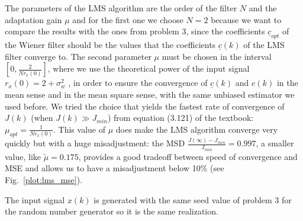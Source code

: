 \documentclass{article}
\renewcommand{\vec}[1]{\underline{#1}}
\newcommand{\E}[1]{\operatorname{E}\left[#1\right]}
\newcommand{\norm}[1]{\left\lVert#1\right\rVert}
\newcommand{\abs}[1]{\left|#1\right|}
\begin{document}
The parameters of the LMS algorithm are the order of the filter $N$
and the adaptation gain $\mu$ and for the first one we choose $N = 2$
because we want to compare the results with the ones from problem 3,
since the coefficients $\vec{c}_{opt}$ of the Wiener filter should be
the values that the coefficients $\vec{c}(k)$ of the LMS filter
converge to.  The second parameter $\mu$ must be chosen in the
interval $\left[0,\frac{2}{Nr_x(0)}\right]$, where we use the
theoretical power of the input signal $r_x(0) = 2 + \sigma^2_w$ , in
order to ensure the convergence of $\vec{c}(k)$ and $e(k)$ in the mean
sense and in the mean square sense,
with the same unbiased estimator we used before.  We tried the choice
that yields the fastest rate of convergence of $J(k)$ (when $J(k) \gg
J_{min}$) from equation (3.121) of the textbook: $\mu_{opt} =
\frac{1}{Nr_x(0)}$. This value of $\mu$ does make the LMS algorithm
converge very quickly but with a huge misadjustment: the MSD
$\frac{J(\infty) - J_{min}}{J_{min}} = 0.997$, a smaller value, like
$\tilde{\mu} = 0.175$, provides a good tradeoff between speed of
convergence and MSE and allows us to have a misadjustment below 10\%
(see Fig.~\ref{plot:lms_mse}).

The input signal $x(k)$ is generated with the same seed value of
problem 3 for the random number generator so it is the same
realization.
\end{document}
